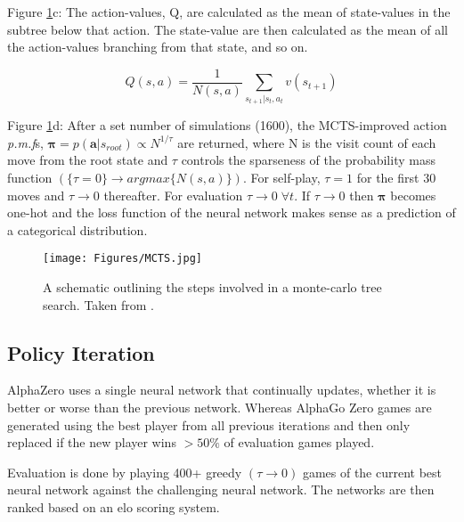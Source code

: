 \documentclass[main.tex]{subfiles}
\begin{document}
Figure \ref{fig:MCTS}c:
The action-values, Q, are calculated as the mean of state-values in the subtree below that action. The state-value are then calculated as the mean of all the action-values branching from that state, and so on.

\begin{equation}
   Q(s, a) = \frac{1}{N(s, a)} \sum_{s_{t+1} | s_t, a_t} v(s_{t+1})
   \label{eqn:actionvalue}
\end{equation} 

Figure \ref{fig:MCTS}d:
After a set number of simulations (1600), the MCTS-improved action \textit{p.m.f}s, $\boldsymbol{\pi} = p(\boldsymbol{a} | s_{root}) \propto N^{1/\tau}$ are returned, where N is the visit count of each move from the root state and $\tau$ controls the sparseness of the probability mass function $(\{\tau = 0\} \rightarrow argmax\{N(s, a)\})$. For self-play, $\tau = 1$ for the first 30 moves and $\tau \rightarrow 0$ thereafter. For evaluation $\tau \rightarrow 0 \; \forall t$. If $\tau \rightarrow 0$ then $\boldsymbol{\pi}$ becomes one-hot and the loss function of the neural network makes sense as a prediction of a categorical distribution.

\begin{figure}[H]
   \centering
   \texttt{[image: Figures/MCTS.jpg]}
   \caption{\label{fig:MCTS} A schematic outlining the steps involved in a monte-carlo tree search. Taken from \cite{AlphaGoZero}.}
\end{figure}

\subsection{Policy Iteration}

AlphaZero uses a single neural network that continually updates, whether it is better or worse than the previous network. Whereas AlphaGo Zero games are generated using the best player from all previous iterations and then only replaced if the new player wins $> 50\%$ of evaluation games played.

Evaluation is done by playing 400+ greedy $(\tau \rightarrow 0)$ games of the current best neural network against the challenging neural network. The networks are then ranked based on an elo scoring system. \\
\end{document}
